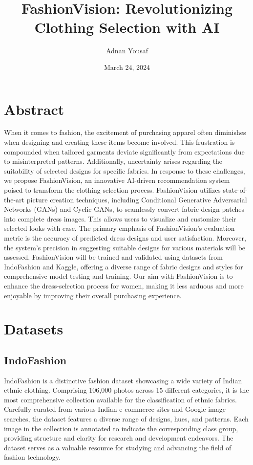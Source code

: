 \documentclass{article}
\title{FashionVision: Revolutionizing Clothing Selection with AI}
\author{Adnan Yousaf}
\date{March 24, 2024}
\begin{document}
\maketitle

\section*{Abstract}
When it comes to fashion, the excitement of purchasing apparel often diminishes when designing and creating these items become involved. This frustration is compounded when tailored garments deviate significantly from expectations due to misinterpreted patterns. Additionally, uncertainty arises regarding the suitability of selected designs for specific fabrics. In response to these challenges, we propose FashionVision, an innovative AI-driven recommendation system poised to transform the clothing selection process. FashionVision utilizes state-of-the-art picture creation techniques, including Conditional Generative Adversarial Networks (GANs) and Cyclic GANs, to seamlessly convert fabric design patches into complete dress images. This allows users to visualize and customize their selected looks with ease. The primary emphasis of FashionVision's evaluation metric is the accuracy of predicted dress designs and user satisfaction. Moreover, the system's precision in suggesting suitable designs for various materials will be assessed. FashionVision will be trained and validated using datasets from IndoFashion and Kaggle, offering a diverse range of fabric designs and styles for comprehensive model testing and training. Our aim with FashionVision is to enhance the dress-selection process for women, making it less arduous and more enjoyable by improving their overall purchasing experience.

\section*{Datasets}

\subsection*{IndoFashion}
IndoFashion is a distinctive fashion dataset showcasing a wide variety of Indian ethnic clothing. Comprising 106,000 photos across 15 different categories, it is the most comprehensive collection available for the classification of ethnic fabrics. Carefully curated from various Indian e-commerce sites and Google image searches, the dataset features a diverse range of designs, hues, and patterns. Each image in the collection is annotated to indicate the corresponding class group, providing structure and clarity for research and development endeavors. The dataset serves as a valuable resource for studying and advancing the field of fashion technology.
\end{document}
